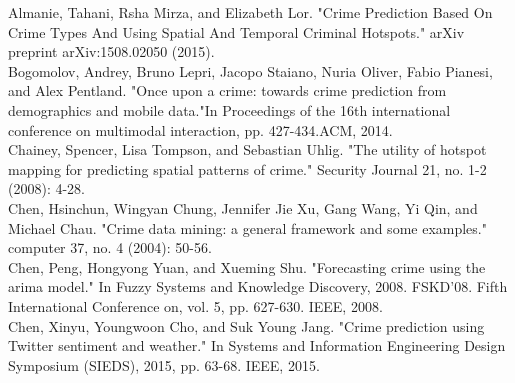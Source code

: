 \documentclass[10pt,journal,compsoc]{IEEEtran}
\begin{document}

%
%
%
\begin{thebibliography}{1}

Almanie, Tahani, Rsha Mirza, and Elizabeth Lor. "Crime Prediction Based On Crime Types And Using Spatial And Temporal Criminal Hotspots." arXiv preprint arXiv:1508.02050 (2015).\\

Bogomolov, Andrey, Bruno Lepri, Jacopo Staiano, Nuria Oliver, Fabio Pianesi, and Alex
Pentland. "Once upon a crime: towards crime prediction from demographics and mobile data."In Proceedings of the 16th international conference on multimodal interaction, pp. 427-434.ACM, 2014.\\

Chainey, Spencer, Lisa Tompson, and Sebastian Uhlig. "The utility of hotspot mapping for
predicting spatial patterns of crime." Security Journal 21, no. 1-2 (2008): 4-28.\\

Chen, Hsinchun, Wingyan Chung, Jennifer Jie Xu, Gang Wang, Yi Qin, and Michael Chau.
"Crime data mining: a general framework and some examples." computer 37, no. 4 (2004):
50-56.\\

Chen, Peng, Hongyong Yuan, and Xueming Shu. "Forecasting crime using the arima model." In
Fuzzy Systems and Knowledge Discovery, 2008. FSKD'08. Fifth International Conference on,
vol. 5, pp. 627-630. IEEE, 2008.\\

Chen, Xinyu, Youngwoon Cho, and Suk Young Jang. "Crime prediction using Twitter sentiment
and weather." In Systems and Information Engineering Design Symposium (SIEDS), 2015, pp.
63-68. IEEE, 2015.\\


\end{thebibliography}
\end{document}
